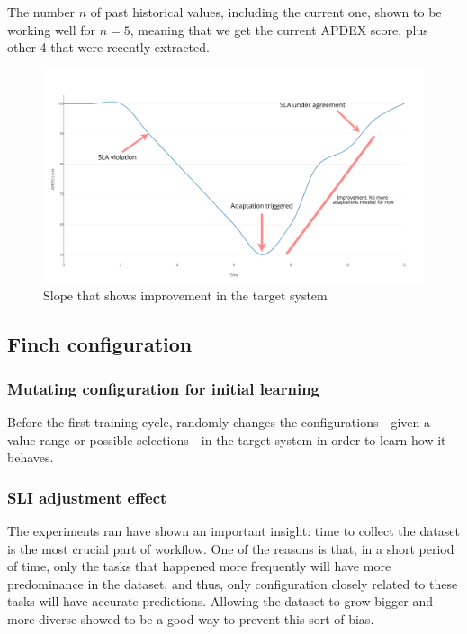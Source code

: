 \begin{appendices}
The number $n$ of past historical values, including the current one, shown to be working well for $n=5$, meaning that we get the current APDEX score, plus other 4 that were recently extracted.

\begin{figure}[t]
  \includegraphics[scale=0.3]{images/detectImprovement.png}
  \caption{Slope that shows improvement in the target system}
  \label{fig:finch3}
\end{figure}
\end{appendices}

\subsection{Finch configuration}

\subsubsection{Mutating configuration for initial learning}

Before the first training cycle, \projectname{} randomly changes the configurations---given a value range or possible selections---in the target system in order to learn how it behaves.


\subsubsection{SLI adjustment effect}

The experiments ran have shown an important insight: time to collect the dataset is the most crucial part of \projectname{} workflow. One of the reasons is that, in a short period of time, only the tasks that happened more frequently will have more predominance in the dataset, and thus, only configuration closely related to these tasks will have accurate predictions. Allowing the dataset to grow bigger and more diverse showed to be a good way to prevent this sort of bias.

